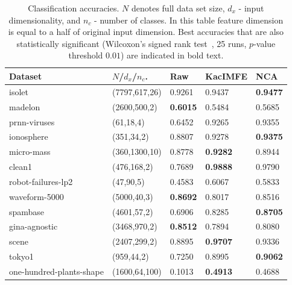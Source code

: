 \documentclass{article}
\begin{document}
\begin{table}	
	\centering
	\begin{tabular}{ |p{3cm}|p{2.0cm}|p{1.2cm}|p{1.7cm}|p{1.2cm}|  }
		\hline
		Dataset & $N$/$d_{x}$/$n_{c}$. & Raw & KacIMFE & NCA  \\
		\hline
		isolet & (7797,617,26)   &  0.9261  &  0.9437  &  \textbf{0.9477} \\
		madelon & (2600,500,2)   &  \textbf{0.6015}  &  0.5484  &  0.5685 \\
		prnn-viruses & (61,18,4)   &  0.6452  &  0.9265  &  0.9355 \\
		ionosphere & (351,34,2)   &  0.8807  &  0.9278  &  \textbf{0.9375} \\
		micro-mass & (360,1300,10)   &  0.8778  &  \textbf{0.9282}  &  0.8944 \\
		clean1 & (476,168,2)   &  0.7689  &  \textbf{0.9888}  &  0.9790 \\
		robot-failures-lp2 & (47,90,5)   &  0.4583  &  0.6067  &  0.5833 \\
		waveform-5000 & (5000,40,3)   &  \textbf{0.8692}  &  0.8017  &  0.8516 \\
		spambase & (4601,57,2)   &  0.6906  &  0.8285  &  \textbf{0.8705} \\
		gina-agnostic & (3468,970,2)   &  \textbf{0.8512}  &  0.7894  &  0.8080 \\
		scene & (2407,299,2)   &  0.8895  &  \textbf{0.9707}  &  0.9336 \\
		tokyo1 & (959,44,2)   &  0.7250  &  0.8995  &  \textbf{0.9062} \\
		one-hundred-plants-shape & (1600,64,100)   &  0.1013  &  \textbf{0.4913}  &  0.4688 \\		
		
		\hline
	\end{tabular}
	\caption{Classification accuracies. $N$ denotes full data set size, $d_{x}$ - input dimensionality, and $n_{c}$ - number of classes. In this table feature dimension is equal to a half of original input dimension. Best accuracies that are also statistically significant (Wilcoxon's signed rank test~\cite{Wilcoxon1992}, 25 runs, $p$-value threshold $0.01$) are indicated in bold text.}
	\label{table:classification_accuracies}	
\end{table}
\end{document}
